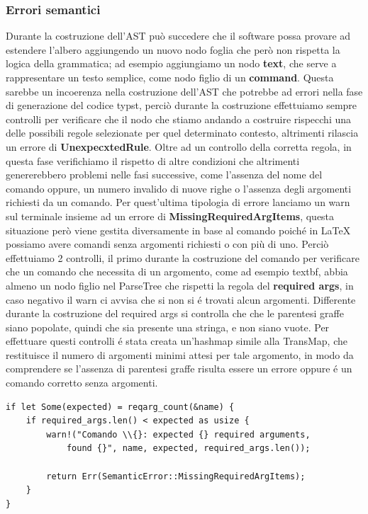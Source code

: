 \documentclass{article}
\begin{document}
    \subsubsection{Errori semantici}
    Durante la costruzione dell'AST può succedere che il software possa provare ad estendere l'albero aggiungendo un nuovo nodo foglia che però non rispetta la logica della grammatica; ad esempio aggiungiamo un nodo \textbf{text}, che serve a rappresentare un testo semplice, come nodo figlio di un \textbf{command}. Questa sarebbe un incoerenza nella costruzione dell'AST che potrebbe ad errori nella fase di generazione del codice typst, perciò durante la costruzione effettuiamo sempre controlli per verificare che il nodo che stiamo andando a costruire rispecchi una delle possibili regole selezionate per quel determinato contesto, altrimenti rilascia un errore di \textbf{UnexpecxtedRule}.
    Oltre ad un controllo della corretta regola, in questa fase verifichiamo il rispetto di altre condizioni che altrimenti genererebbero problemi nelle fasi successive, come l'assenza del nome del comando oppure, un numero invalido di nuove righe o l'assenza degli argomenti richiesti da un comando. Per quest'ultima tipologia di errore lanciamo un warn sul terminale insieme ad un errore di \textbf{MissingRequiredArgItems}, questa situazione però viene gestita diversamente in base al comando poiché in LaTeX possiamo avere comandi senza argomenti richiesti o con più di uno. Perciò effettuiamo 2 controlli, il primo durante la costruzione del comando per verificare che un comando che necessita di un argomento, come ad esempio textbf, abbia almeno un nodo figlio nel ParseTree che rispetti la regola del \textbf{required args}, in caso negativo il warn ci avvisa che si non si é trovati alcun argomenti. Differente durante la costruzione del required args si controlla che che le parentesi graffe siano popolate, quindi che sia presente una stringa, e non siano vuote. Per effettuare questi controlli é stata creata un'hashmap simile alla TransMap, che restituisce il numero di argomenti minimi attesi per tale argomento, in modo da comprendere se l'assenza di parentesi graffe risulta essere un errore oppure é un comando corretto senza argomenti.
    \begin{verbatim}
if let Some(expected) = reqarg_count(&name) {
    if required_args.len() < expected as usize {
        warn!("Comando \\{}: expected {} required arguments, 
            found {}", name, expected, required_args.len());
            
        return Err(SemanticError::MissingRequiredArgItems);
    }
}
    \end{verbatim}
\end{document}
